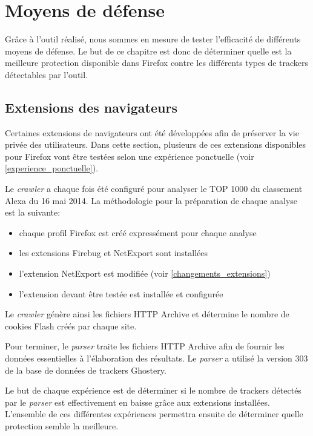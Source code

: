 \chapter{Moyens de défense}
Grâce à l'outil réalisé, nous sommes en mesure de tester l'efficacité de différents moyens de défense.
Le but de ce chapitre est donc de déterminer quelle est la meilleure protection disponible dans Firefox contre les différents types de trackers détectables par l'outil.

\section{Extensions des navigateurs}
\label{extensions_navigateurs}
Certaines extensions de navigateurs ont été développées afin de préserver la vie privée des utilisateurs.
Dans cette section, plusieurs de ces extensions disponibles pour Firefox vont être testées selon une expérience ponctuelle (voir \autoref{experience_ponctuelle}).
\newline

Le \textit{crawler} a chaque fois été configuré pour analyser le TOP 1000 du classement Alexa \cite{AlexaTop} du 16 mai 2014. La méthodologie pour la préparation de chaque analyse est la suivante:
\begin{itemize}
  \item chaque profil Firefox est créé expressément pour chaque analyse
  \item les extensions Firebug et NetExport sont installées
  \item l'extension NetExport est modifiée (voir \autoref{changements_extensions})
  \item l'extension devant être testée est installée et configurée
  \newline
\end{itemize}

Le \textit{crawler} génère ainsi les fichiers HTTP Archive et détermine le nombre de cookies Flash créés par chaque site.
\newline

Pour terminer, le \textit{parser} traite les fichiers HTTP Archive afin de fournir les données essentielles à l'élaboration des résultats. Le \textit{parser} a utilisé la version 303 de la base de données de trackers Ghostery.
\newline

Le but de chaque expérience est de déterminer si le nombre de trackers détectés par le \textit{parser} est effectivement en baisse grâce aux extensions installées. L'ensemble de ces différentes expériences permettra ensuite de déterminer quelle protection semble la meilleure.
\newline

